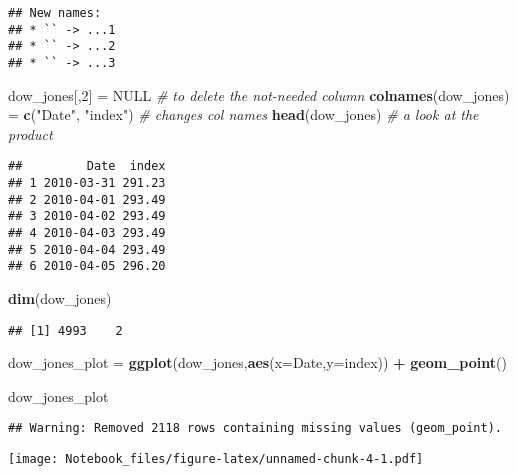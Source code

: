 \documentclass[
]{article}
\newenvironment{Shaded}{\begin{snugshade}}{\end{snugshade}}
\newcommand{\CommentTok}[1]{\textcolor[rgb]{0.56,0.35,0.01}{\textit{#1}}}
\newcommand{\DataTypeTok}[1]{\textcolor[rgb]{0.13,0.29,0.53}{#1}}
\newcommand{\DecValTok}[1]{\textcolor[rgb]{0.00,0.00,0.81}{#1}}
\newcommand{\KeywordTok}[1]{\textcolor[rgb]{0.13,0.29,0.53}{\textbf{#1}}}
\newcommand{\NormalTok}[1]{#1}
\newcommand{\OperatorTok}[1]{\textcolor[rgb]{0.81,0.36,0.00}{\textbf{#1}}}
\newcommand{\OtherTok}[1]{\textcolor[rgb]{0.56,0.35,0.01}{#1}}
\newcommand{\StringTok}[1]{\textcolor[rgb]{0.31,0.60,0.02}{#1}}
\begin{document}
\begin{verbatim}
## New names:
## * `` -> ...1
## * `` -> ...2
## * `` -> ...3
\end{verbatim}

\begin{Shaded}
\begin{Highlighting}[]
\NormalTok{dow_jones[,}\DecValTok{2}\NormalTok{] =}\StringTok{ }\OtherTok{NULL}                        \CommentTok{# to delete the not-needed column}
\KeywordTok{colnames}\NormalTok{(dow_jones) =}\StringTok{ }\KeywordTok{c}\NormalTok{(}\StringTok{"Date"}\NormalTok{, }\StringTok{"index"}\NormalTok{)    }\CommentTok{# changes col names}
\KeywordTok{head}\NormalTok{(dow_jones)                             }\CommentTok{# a look at the product}
\end{Highlighting}
\end{Shaded}

\begin{verbatim}
##         Date  index
## 1 2010-03-31 291.23
## 2 2010-04-01 293.49
## 3 2010-04-02 293.49
## 4 2010-04-03 293.49
## 5 2010-04-04 293.49
## 6 2010-04-05 296.20
\end{verbatim}

\begin{Shaded}
\begin{Highlighting}[]
\KeywordTok{dim}\NormalTok{(dow_jones)}
\end{Highlighting}
\end{Shaded}

\begin{verbatim}
## [1] 4993    2
\end{verbatim}

\begin{Shaded}
\begin{Highlighting}[]
\NormalTok{dow_jones_plot =}\StringTok{ }\KeywordTok{ggplot}\NormalTok{(dow_jones,}\KeywordTok{aes}\NormalTok{(}\DataTypeTok{x=}\NormalTok{Date,}\DataTypeTok{y=}\NormalTok{index)) }\OperatorTok{+}\StringTok{ }\KeywordTok{geom_point}\NormalTok{()}

\NormalTok{dow_jones_plot}
\end{Highlighting}
\end{Shaded}

\begin{verbatim}
## Warning: Removed 2118 rows containing missing values (geom_point).
\end{verbatim}

\texttt{[image: Notebook\_files/figure-latex/unnamed-chunk-4-1.pdf]}
\end{document}
